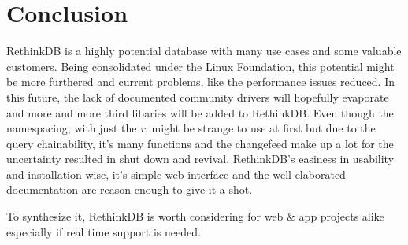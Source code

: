 \section{Conclusion}

RethinkDB is a highly potential database with many use cases and some valuable customers. Being consolidated under the Linux Foundation, this potential might be more furthered and current problems, like the performance issues reduced. In this future, the lack of documented community drivers will hopefully evaporate and more and more third libaries will be added to RethinkDB.  Even though the namespacing, with just the \textit{r}, might be strange to use at first but due to the query chainability, it's many functions and the changefeed make up a lot for the uncertainty resulted in shut down and revival. RethinkDB's easiness in usability and installation-wise, it's simple web interface and the well-elaborated documentation are reason enough to give it a shot.

To synthesize it, RethinkDB is worth considering for web \& app projects alike especially if real time support is needed.